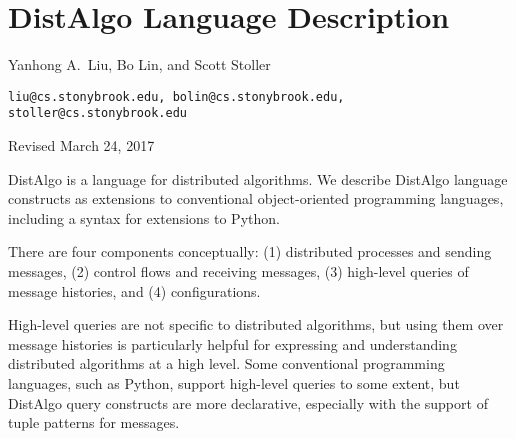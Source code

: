 \documentclass[12pt]{article}
\newcommand{\notes}[1]{} %
\newcommand{\body}[1]{} %
\newcommand{\mysubsec}[1]{\subsection*{#1}}
\newcommand{\mypar}[1]{\vspace{2ex}\noindent\b{#1.}~}
\newcommand{\m}[1]{$#1$} %
\renewcommand{\c}[1]{{\tt\small #1}} %
\renewcommand{\b}[1]{{\bf #1}} %
\renewcommand{\|}{\mathify{\,\mbox{\c{|}}\,}} %
\renewcommand{\=}{\mathify{\,=\,}\linebreak[0]}
\begin{document}
\body{} %

\newpage
\appendix

\renewcommand{\thesection}{\arabic{section}}

\setcounter{page}{1}
\setcounter{section}{0}


\notes{}

\section*{{\Large DistAlgo Language Description}}

{\large Yanhong A.\ Liu, Bo Lin, and Scott Stoller}

\c{liu@cs.stonybrook.edu, bolin@cs.stonybrook.edu, stoller@cs.stonybrook.edu}

{\small Revised March 24, 2017}
\vspace{4ex}

\def\langmap{\vspace{.5ex}\m{\longrightarrow}~\b{in Python syntax:~}
  \vspace{.0ex}}
\renewcommand{\mysubsec}[1]{\section{#1}}
\renewcommand{\mypar}[1]{\vspace{-1ex}\subsection{#1}\vspace{-1ex}}
\newcommand{\mysubpar}[1]{\vspace{-2ex}\paragraph{#1.}}


DistAlgo is a language for distributed algorithms.  We describe DistAlgo
language constructs as extensions to conventional object-oriented
programming languages, including a syntax for extensions to Python.

There are four components conceptually: (1) distributed processes and
sending messages, (2) control flows and receiving messages, (3) high-level
queries of message histories, and (4) configurations.

High-level queries are not specific to distributed algorithms, but using
them over message histories is particularly helpful for expressing and
understanding distributed algorithms at a high level.  Some conventional
programming languages, such as Python, support high-level queries to some
extent, but DistAlgo query constructs are more declarative, especially with
the support of tuple patterns for messages.
\end{document}
